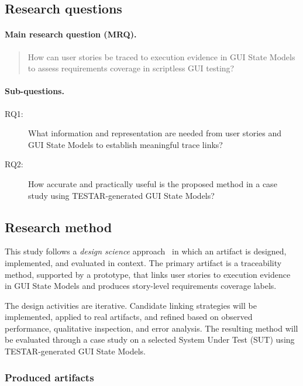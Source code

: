 \subsection{Research questions}
\label{subsec:research-questions}

\paragraph{Main research question (MRQ).}
\begin{quote}
How can user stories be traced to execution evidence in GUI State Models to assess requirements coverage in scriptless GUI testing?
\end{quote}

\paragraph{Sub-questions.}
\begin{description}
    \item[RQ1:] What information and representation are needed from user stories and GUI State Models to establish meaningful trace links?
    \item[RQ2:] How accurate and practically useful is the proposed method in a case study using TESTAR-generated GUI State Models?
\end{description}

\subsection{Research method}
\label{subsec:research-method}

This study follows a \emph{design science} approach~\citep{peffers2007design} in which an artifact is designed, implemented, and evaluated in context. The primary artifact is a traceability method, supported by a prototype, that links user stories to execution evidence in GUI State Models and produces story-level requirements coverage labels.

The design activities are iterative. Candidate linking strategies will be implemented, applied to real artifacts, and refined based on observed performance, qualitative inspection, and error analysis. The resulting method will be evaluated through a case study on a selected System Under Test (SUT) using TESTAR-generated GUI State Models.

\subsubsection{Produced artifacts}
\label{subsubsec:produced-artifacts}

